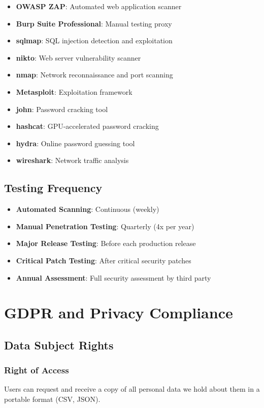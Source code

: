 \documentclass{report}
\begin{document}
\begin{itemize}
\item \textbf{OWASP ZAP}: Automated web application scanner
\item \textbf{Burp Suite Professional}: Manual testing proxy
\item \textbf{sqlmap}: SQL injection detection and exploitation
\item \textbf{nikto}: Web server vulnerability scanner
\item \textbf{nmap}: Network reconnaissance and port scanning
\item \textbf{Metasploit}: Exploitation framework
\item \textbf{john}: Password cracking tool
\item \textbf{hashcat}: GPU-accelerated password cracking
\item \textbf{hydra}: Online password guessing tool
\item \textbf{wireshark}: Network traffic analysis
\end{itemize}

\section{Testing Frequency}

\begin{itemize}
\item \textbf{Automated Scanning}: Continuous (weekly)
\item \textbf{Manual Penetration Testing}: Quarterly (4x per year)
\item \textbf{Major Release Testing}: Before each production release
\item \textbf{Critical Patch Testing}: After critical security patches
\item \textbf{Annual Assessment}: Full security assessment by third party
\end{itemize}

\chapter{GDPR and Privacy Compliance}

\section{Data Subject Rights}

\subsection{Right of Access}
Users can request and receive a copy of all personal data we hold about them in a portable format (CSV, JSON).
\end{document}
